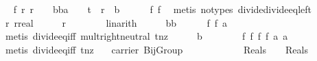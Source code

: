 \begin{isabellebody}
\ \isamarkupfalse%
\ f{}{\isacharcolon}\ {\isachardoublequoteopen}{\isasymforall}r{\isachardot}\ {\isacharparenleft}r\ {\isacharequal}\ {}\ {\isasymor}\ bba{\isacharparenright}\ {\isasymor}\ {}\ {\isacharslash}\ t\ {\isacharslash}\ r\ {\isasymnoteq}\ b{\isachardoublequoteclose}\isanewline
\ \ \ \ \isamarkupfalse%
\ f{}\ f{}\ \isamarkupfalse%
\ {\isacharparenleft}metis\ {\isacharparenleft}no{\isacharunderscore}types{\isacharparenright}\ divide{\isacharunderscore}divide{\isacharunderscore}eq{\isacharunderscore}left{\isacharparenright}\isanewline
\ \ \isamarkupfalse%
\ {\isachardoublequoteopen}{\isasymforall}r{\isachardot}\ {\isacharparenleft}r{\isacharcolon}{\isacharcolon}real{\isacharparenright}\ {\isacharasterisk}\ {}\ {\isacharequal}\ {}\ {\isasymor}\ r\ {\isacharequal}\ {}{\isachardoublequoteclose}\isanewline
\ \ \ \ \isamarkupfalse%
\ linarith\isanewline
\ \ \isamarkupfalse%
\ \isamarkupfalse%
\ bb\isanewline
\ \ \ \ \isamarkupfalse%
\ f{}\ f{}\ a{}\ \isamarkupfalse%
\ {\isacharparenleft}metis\ divide{\isacharunderscore}eq{\isacharunderscore}{}{\isacharunderscore}iff\ mult{\isachardot}right{\isacharunderscore}neutral\ t{\isacharunderscore}nz{\isacharparenright}\isanewline
\ \ \isamarkupfalse%
\ \isamarkupfalse%
\ {\isachardoublequoteopen}b\ {\isacharequal}\ {}{\isachardoublequoteclose}\isanewline
\ \ \ \ \isamarkupfalse%
\ f{}\ f{}\ f{}\ f{}\ a{}\ a{}\ \isamarkupfalse%
\ {\isacharparenleft}metis\ divide{\isacharunderscore}eq{\isacharunderscore}{}{\isacharunderscore}iff\ t{\isacharunderscore}nz{\isacharparenright}\isanewline
{}\isamarkupfalse%
%
\endisatagproof
{\isafoldproof}%
%
\isadelimproof
\isanewline
%
\endisadelimproof
\isanewline
{}\isamarkupfalse%
\ {\isachardoublequoteopen}{\isasymrho}\ {\isasymin}\ carrier\ {\isacharparenleft}BijGroup\isanewline
\ \ \ \ \ \ \ \ \ \ \ \ {\isacharparenleft}{\isacharparenleft}Reals\ {\isacharminus}\ {\isacharbraceleft}{}{\isacharbraceright}{\isacharparenright}\ {\isasymtimes}\ {\isacharparenleft}Reals\ {\isacharminus}\ {\isacharbraceleft}{}{\isacharbraceright}{\isacharparenright}{\isacharparenright}{\isacharparenright}{\isachardoublequoteclose}\isanewline

\end{isabellebody}
